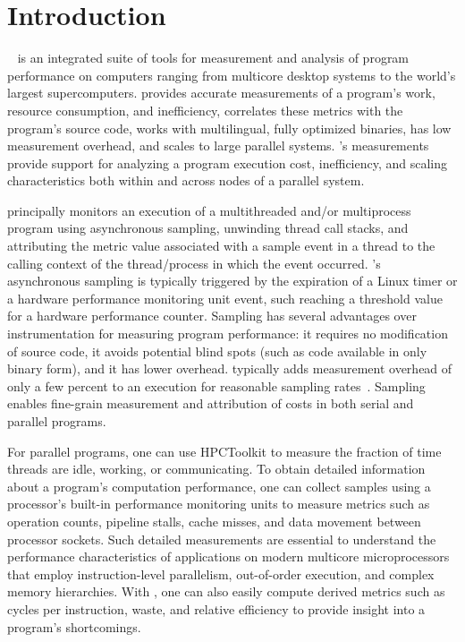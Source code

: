 \documentclass[11pt,twoside,letterpaper]{report}
\begin{document}

\pagestyle{plain}

\chapter{Introduction}

\setcounter{page}{1}

\HPCToolkit{}~\cite{Adhianto-etal:2010:CPE-hpctoolkit,hpctoolkit-www} is an integrated suite of tools for measurement and analysis of program performance on computers ranging from multicore desktop systems to the world's largest supercomputers.
\HPCToolkit{} provides accurate measurements of a program's work, resource consumption, and inefficiency, correlates these metrics with the program's source code, works with multilingual, fully optimized binaries, has low measurement overhead, and scales to large parallel systems.
\HPCToolkit{}'s measurements provide support for analyzing a program execution cost, inefficiency, and scaling characteristics both within and across nodes of a parallel system.

\HPCToolkit{} principally monitors an execution of a multithreaded and/or multiprocess program using asynchronous sampling, unwinding thread call stacks, and attributing the metric value associated with a sample event in a thread to the calling context of the thread/process in which the event occurred. \HPCToolkit{}'s asynchronous sampling is typically triggered by the expiration of a Linux timer or a hardware performance monitoring unit event, such reaching a threshold value for a hardware performance counter.
Sampling has several advantages over instrumentation for measuring program performance: it requires no modification of source code, it avoids potential blind spots (such as code available in only binary form), and it has lower overhead.
\HPCToolkit{} typically adds measurement overhead of only a few percent to an execution for reasonable sampling rates~\cite{Tallent-MC-Fagan:2009:PLDI-hpctoolkit-binary-analysis}.
Sampling enables fine-grain measurement and attribution of costs in both serial and parallel programs.

For parallel programs, one can use HPCToolkit to measure
the fraction of time threads are idle, working, or communicating.
To obtain detailed information about a program's computation
performance, one can collect samples using a processor's built-in performance monitoring
units to measure metrics such as
operation counts, pipeline stalls, cache misses, and data movement
between processor sockets.  Such detailed measurements are essential
to understand the performance characteristics of applications
on modern multicore microprocessors that employ instruction-level
parallelism, out-of-order execution, and complex memory hierarchies.
With \HPCToolkit{}, one can also easily compute derived metrics such as cycles
per instruction, waste, and relative efficiency to provide insight
into a program's shortcomings.
\end{document}
